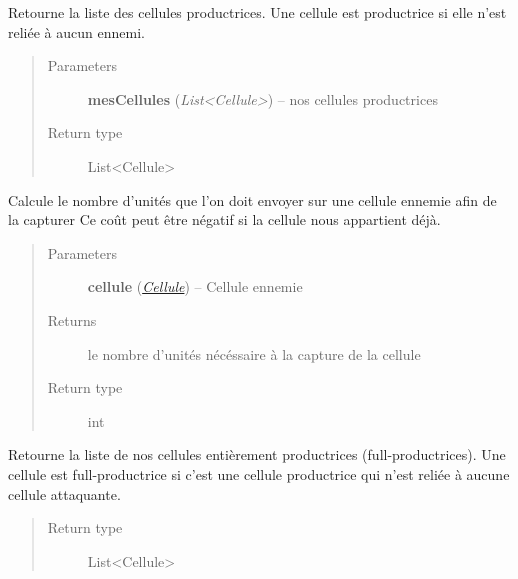 \documentclass[letterpaper,10pt,english]{sphinxmanual}
\begin{document}
\begin{fulllineitems}
\begin{fulllineitems}
\label{index:StrategieAnalyse.StrategieAnalyse.getCellulesProductrices}
Retourne la liste des cellules productrices.
Une cellule est productrice si elle n'est reliée à aucun ennemi.
\begin{quote}\begin{description}
\item[{Parameters}] \leavevmode
\textbf{mesCellules} (\emph{List\textless{}Cellule\textgreater{}}) -- nos cellules productrices

\item[{Return type}] \leavevmode
List\textless{}Cellule\textgreater{}

\end{description}\end{quote}

\end{fulllineitems}


\begin{fulllineitems}
\label{index:StrategieAnalyse.StrategieAnalyse.getCoutCellule}
Calcule le nombre d'unités que l'on doit envoyer sur une cellule ennemie afin de la capturer
Ce coût peut être négatif si la cellule nous appartient déjà.
\begin{quote}\begin{description}
\item[{Parameters}] \leavevmode
\textbf{cellule} ({\hyperref[index:module-Cellule]{\emph{Cellule}}}) -- Cellule ennemie

\item[{Returns}] \leavevmode
le nombre d'unités nécéssaire à la capture de la cellule

\item[{Return type}] \leavevmode
int

\end{description}\end{quote}

\end{fulllineitems}


\begin{fulllineitems}
\label{index:StrategieAnalyse.StrategieAnalyse.getFullProductrices}
Retourne la liste de nos cellules entièrement productrices (full-productrices).
Une cellule est full-productrice si c'est une cellule productrice qui n'est reliée à aucune cellule attaquante.
\begin{quote}\begin{description}
\item[{Return type}] \leavevmode
List\textless{}Cellule\textgreater{}


\end{description}
\end{quote}
\end{fulllineitems}
\end{fulllineitems}
\end{document}
